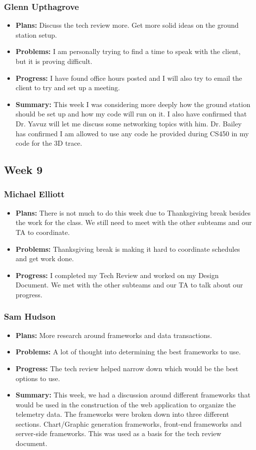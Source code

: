 \documentclass[onecolumn, draftclsnofoot,10pt, compsoc]{IEEEtran}
\begin{document}
\subsubsection{Glenn Upthagrove}
\begin {itemize}
 \item \textbf{Plans: }Discuss the tech review more. Get more solid ideas on the ground station setup. 
 \item \textbf{Problems: }I am personally trying to find a time to speak with the client, but it is proving difficult. 
 \item \textbf{Progress: }I have found office hours posted and I will also try to email the client to try and set up a meeting.
 \item \textbf{Summary: }This week I was considering more deeply how the ground station should be set up and how my code will run on it. I also have confirmed that Dr. Yavuz will let me discuss some networking topics with him. Dr. Bailey has confirmed I am allowed to use any code he provided during CS450 in my code for the 3D trace.  
\end {itemize}
\subsection {Week 9}
\subsubsection{Michael Elliott}
\begin {itemize}
\item \textbf{Plans: }
  There is not much to do this week due to Thanksgiving break besides the work for the class. We still need to meet with the other subteams and our TA to coordinate.
\item \textbf{Problems: }
  Thanksgiving break is making it hard to coordinate schedules and get work done.
\item \textbf{Progress: }
  I completed my Tech Review and worked on my Design Document. We met with the other subteams and our TA to talk about our progress.
\end {itemize}
\subsubsection{Sam Hudson}
\begin {itemize}
\item \textbf{Plans: }More research around frameworks and data transactions. 
\item \textbf{Problems: }A lot of thought into determining the best frameworks to use.
\item \textbf{Progress: }The tech review helped narrow down which would be the best options to use.
\item \textbf{Summary: }This week, we had a discussion around different frameworks that would be used in the construction of the web application to organize the telemetry data.  The frameworks were broken down into three different sections. Chart/Graphic generation frameworks, front-end frameworks and server-side frameworks. This was used as a basis for the tech review document. 
\end {itemize}
\end{document}
